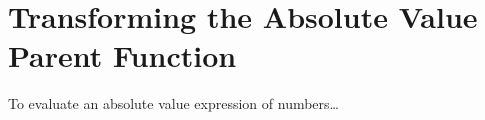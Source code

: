 

\section*{Transforming the Absolute Value Parent Function}

\begin{myConceptSteps}{To evaluate an absolute value expression of numbers\dots}
\end{myConceptSteps}
